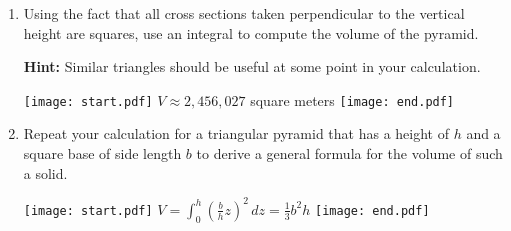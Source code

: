 \documentclass[12pt]{article}
\begin{document}
\begin{enumerate}
\begin{enumerate}
\item Using the fact that all cross sections taken perpendicular to the vertical height are squares, use an integral to compute the volume of the pyramid.

{\bf Hint:} Similar triangles should be useful at some point in your calculation.

\texttt{[image: start.pdf]}
{{$V\approx2,456,027$ square meters}}
\texttt{[image: end.pdf]}


\item Repeat your calculation for a triangular pyramid that has a height of $h$ and a square base of side length $b$ to derive a general formula for the volume of such a solid.

\texttt{[image: start.pdf]}
{{$V=\int_0^h \left(\frac{b}{h}z\right)^2 \,dz=\frac{1}{3}b^2h$}}
\texttt{[image: end.pdf]}


\end{enumerate}

\end{enumerate}
\end{document}
